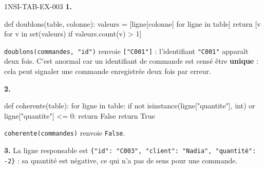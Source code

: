 \begin{corrige}{1NSI-TAB-EX-003}
\textbf{1.}
\begin{python}
def doublons(table, colonne):
    valeurs = [ligne[colonne] for ligne in table]
    return [v for v in set(valeurs) if valeurs.count(v) > 1]
\end{python}
\lstinline{doublons(commandes, "id")} renvoie \lstinline{["C001"]} : l'identifiant
\lstinline{"C001"} apparaît deux fois. C'est anormal car un identifiant de commande est
censé être \textbf{unique} : cela peut signaler une commande enregistrée deux fois par
erreur.

\textbf{2.}
\begin{python}
def coherente(table):
    for ligne in table:
        if not isinstance(ligne["quantite"], int) or ligne["quantite"] <= 0:
            return False
    return True
\end{python}
\lstinline{coherente(commandes)} renvoie \lstinline{False}.

\textbf{3.} La ligne responsable est \lstinline|{"id": "C003", "client": "Nadia", "quantité": -2}| : sa quantité est négative, ce qui n'a pas de sens pour une commande.
\end{corrige}
